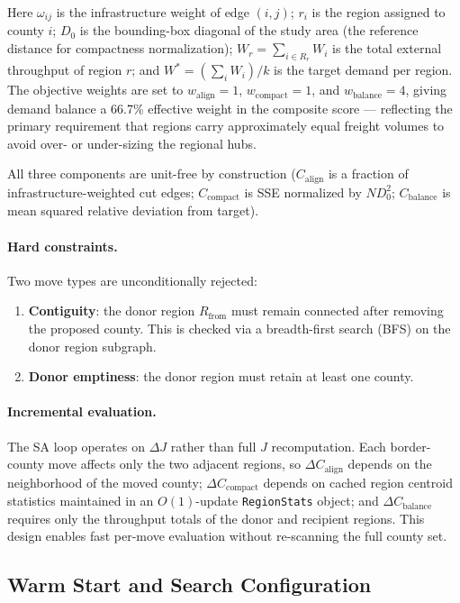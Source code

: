 Here $\omega_{ij}$ is the infrastructure weight of edge $(i,j)$; $r_i$ is the region
assigned to county $i$; $D_0$ is the bounding-box diagonal of the study area (the
reference distance for compactness normalization); $W_r = \sum_{i \in R_r} W_i$ is the
total external throughput of region $r$; and $W^* = (\sum_i W_i) / k$ is the target
demand per region. The objective weights are set to $w_{\text{align}} = 1$,
$w_{\text{compact}} = 1$, and $w_{\text{balance}} = 4$, giving demand balance a 66.7\%
effective weight in the composite score — reflecting the primary requirement that regions
carry approximately equal freight volumes to avoid over- or under-sizing the regional
hubs.

All three components are unit-free by construction ($C_{\text{align}}$ is a fraction of
infrastructure-weighted cut edges; $C_{\text{compact}}$ is SSE normalized by $N D_0^2$;
$C_{\text{balance}}$ is mean squared relative deviation from target).

\paragraph{Hard constraints.}
Two move types are unconditionally rejected:
\begin{enumerate}
  \item \textbf{Contiguity}: the donor region $R_{\text{from}}$ must remain connected
        after removing the proposed county. This is checked via a breadth-first search
        (BFS) on the donor region subgraph.
  \item \textbf{Donor emptiness}: the donor region must retain at least one county.
\end{enumerate}

\paragraph{Incremental evaluation.}
The SA loop operates on $\Delta J$ rather than full $J$ recomputation. Each border-county
move affects only the two adjacent regions, so $\Delta C_{\text{align}}$ depends on the
neighborhood of the moved county; $\Delta C_{\text{compact}}$ depends on cached region
centroid statistics maintained in an $O(1)$-update \texttt{RegionStats} object;
and $\Delta C_{\text{balance}}$ requires only the throughput totals of the donor and
recipient regions. This design enables fast per-move evaluation without re-scanning the
full county set.

\subsection{Warm Start and Search Configuration}

